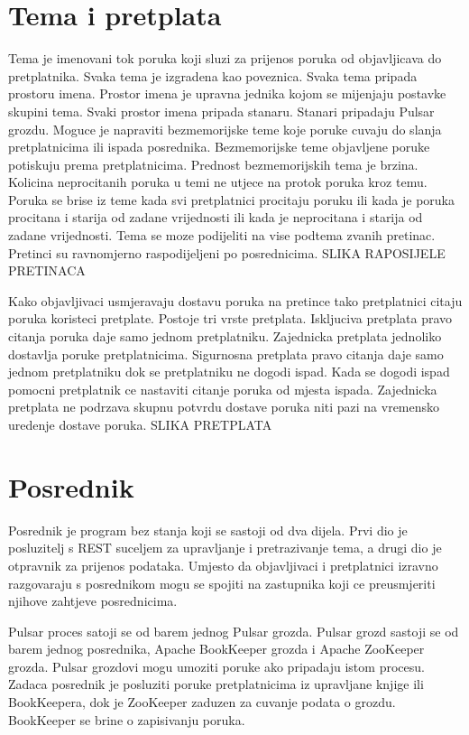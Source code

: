 \documentclass[times, utf8, diplomski, numeric]{fer}
\begin{document}
\chapter{Tema i pretplata}
Tema je imenovani tok poruka koji sluzi za prijenos poruka od objavljicava do pretplatnika. Svaka tema je izgradena kao poveznica. Svaka tema pripada prostoru imena. Prostor imena je upravna jednika kojom se mijenjaju postavke skupini tema. Svaki prostor imena pripada stanaru. Stanari pripadaju Pulsar grozdu. Moguce je napraviti bezmemorijske teme koje poruke cuvaju do slanja pretplatnicima ili ispada posrednika. Bezmemorijske teme objavljene poruke potiskuju prema pretplatnicima. Prednost bezmemorijskih tema je brzina. Kolicina neprocitanih poruka u temi ne utjece na protok poruka kroz temu. Poruka se brise iz teme kada svi pretplatnici procitaju poruku ili kada je poruka procitana i starija od zadane vrijednosti ili kada je neprocitana i starija od zadane vrijednosti. Tema se moze podijeliti na vise podtema zvanih pretinac. Pretinci su ravnomjerno raspodijeljeni po posrednicima. 
SLIKA RAPOSIJELE PRETINACA

Kako objavljivaci usmjeravaju dostavu poruka na pretince tako pretplatnici citaju poruka koristeci pretplate. Postoje tri vrste pretplata. Iskljuciva pretplata pravo citanja poruka daje samo jednom pretplatniku. Zajednicka pretplata jednoliko dostavlja poruke pretplatnicima. Sigurnosna pretplata pravo citanja daje samo jednom pretplatniku dok se pretplatniku ne dogodi ispad. Kada se dogodi ispad pomocni pretplatnik ce nastaviti citanje poruka od mjesta ispada. Zajednicka pretplata ne podrzava skupnu potvrdu dostave poruka niti pazi na vremensko uredenje dostave poruka.
SLIKA PRETPLATA



\chapter{Posrednik}
Posrednik je program bez stanja koji se sastoji od dva dijela. Prvi dio je posluzitelj s REST suceljem za upravljanje i pretrazivanje tema, a drugi dio je otpravnik za prijenos podataka. Umjesto da objavljivaci i pretplatnici izravno razgovaraju s posrednikom mogu se spojiti na zastupnika koji ce preusmjeriti njihove zahtjeve posrednicima.

Pulsar proces satoji se od barem jednog Pulsar grozda. Pulsar grozd sastoji se od barem jednog posrednika, Apache BookKeeper grozda i Apache ZooKeeper grozda. Pulsar grozdovi mogu umoziti poruke ako pripadaju istom procesu. Zadaca posrednik je posluziti poruke pretplatnicima iz upravljane knjige ili BookKeepera, dok je ZooKeeper zaduzen za cuvanje podata o grozdu. BookKeeper se brine o zapisivanju poruka.
\end{document}
